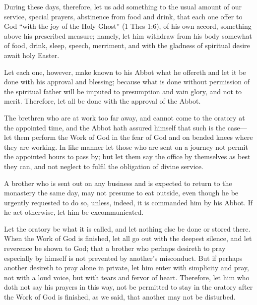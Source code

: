 During these days, therefore, let us add something to the usual amount of our service, special prayers, abstinence from food and drink, that each one offer to God ``with the joy of the Holy Ghost'' (1 Thes 1:6), of his own accord, something above his prescribed measure; namely, let him withdraw from his body somewhat of food, drink, sleep, speech, merriment, and with the gladness of spiritual desire await holy Easter.

Let each one, however, make known to his Abbot what he offereth and let it be done with his approval and blessing; because what is done without permission of the spiritual father will be imputed to presumption and vain glory, and not to merit. Therefore, let all be done with the approval of the Abbot.


The brethren who are at work too far away, and cannot come to the oratory at the appointed time, and the Abbot hath assured himself that such is the case—let them perform the Work of God in the fear of God and on bended knees where they are working. In like manner let those who are sent on a journey not permit the appointed hours to pass by; but let them say the office by themselves as best they can, and not neglect to fulfil the obligation of divine service.


A brother who is sent out on any business and is expected to return to the monastery the same day, may not presume to eat outside, even though he be urgently requested to do so, unless, indeed, it is commanded him by his Abbot. If he act otherwise, let him be excommunicated.


Let the oratory be what it is called, and let nothing else be done or stored there. When the Work of God is finished, let all go out with the deepest silence, and let reverence be shown to God; that a brother who perhaps desireth to pray especially by himself is not prevented by another's misconduct. But if perhaps another desireth to pray alone in private, let him enter with simplicity and pray, not with a loud voice, but with tears and fervor of heart. Therefore, let him who doth not say his prayers in this way, not be permitted to stay in the oratory after the Work of God is finished, as we said, that another may not be disturbed.

